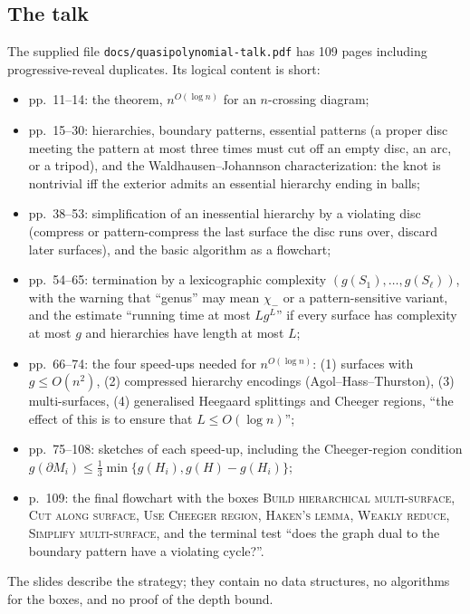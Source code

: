 \documentclass[11pt]{article}
\theoremstyle{remark}
\newcommand{\code}[1]{\texttt{#1}}
\newcommand{\qp}{n^{O(\log n)}}
\begin{document}
\subsection{The talk}
The supplied file \code{docs/quasipolynomial-talk.pdf} has 109 pages including
progressive-reveal duplicates. Its logical content is short:
\begin{itemize}
\item pp.~11--14: the theorem, $\qp$ for an $n$-crossing diagram;
\item pp.~15--30: hierarchies, boundary patterns, essential patterns (a proper
  disc meeting the pattern at most three times must cut off an empty disc, an
  arc, or a tripod), and the Waldhausen--Johannson characterization: the knot
  is nontrivial iff the exterior admits an essential hierarchy ending in balls;
\item pp.~38--53: simplification of an inessential hierarchy by a violating disc
  (compress or pattern-compress the last surface the disc runs over, discard
  later surfaces), and the basic algorithm as a flowchart;
\item pp.~54--65: termination by a lexicographic complexity $(g(S_1),\dots,g(S_\ell))$,
  with the warning that ``genus'' may mean $\chi_-$ or a pattern-sensitive
  variant, and the estimate ``running time at most $Lg^L$'' if every surface
  has complexity at most $g$ and hierarchies have length at most $L$;
\item pp.~66--74: the four speed-ups needed for $\qp$: (1) surfaces with
  $g\le O(n^2)$, (2) compressed hierarchy encodings (Agol--Hass--Thurston),
  (3) multi-surfaces, (4) generalised Heegaard splittings and Cheeger regions,
  ``the effect of this is to ensure that $L\le O(\log n)$'';
\item pp.~75--108: sketches of each speed-up, including the Cheeger-region
  condition $g(\partial M_i)\le\frac13\min\{g(H_i),g(H)-g(H_i)\}$;
\item p.~109: the final flowchart with the boxes \textsc{Build hierarchical
  multi-surface}, \textsc{Cut along surface}, \textsc{Use Cheeger region},
  \textsc{Haken's lemma}, \textsc{Weakly reduce}, \textsc{Simplify
  multi-surface}, and the terminal test ``does the graph dual to the boundary
  pattern have a violating cycle?''.
\end{itemize}
The slides describe the strategy; they contain no data structures, no
algorithms for the boxes, and no proof of the depth bound.
\end{document}
